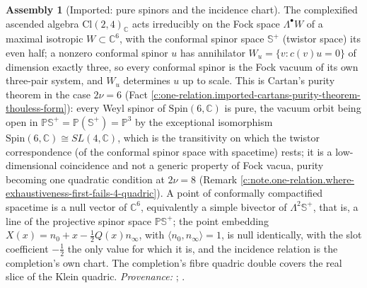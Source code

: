 \documentclass[11pt]{article}
\theoremstyle{definition}
\newtheorem{assembled}[theorem]{Assembly}
\theoremstyle{plain}
\newcommand{\changedmark}[2]{\marginpar{\raggedright\scriptsize\color{#1}#2}}
\providecommand{\C}{}\renewcommand{\C}{\mathbb{C}}
\providecommand{\CS}{}\renewcommand{\CS}{{\mathbb{S}^{+}}}
\providecommand{\Cl}{}\renewcommand{\Cl}{\mathrm{Cl}}
\providecommand{\PCS}{}\renewcommand{\PCS}{\mathbb{P}{\mathbb{S}^{+}}}
\providecommand{\ip}{}\renewcommand{\ip}[2]{\langle #1, #2\rangle}
\begin{document}
\begin{assembled}[Imported: pure spinors and the incidence chart]\label{c:one-relation.imported-pure-spinors-incidence-chart}
\changedmark{gray}{reworded}
The complexified ascended algebra $\Cl(2,4)_{\C}$ acts irreducibly on the Fock space $\Lambda^{\bullet}W$ of a maximal isotropic $W \subset \C^{6}$, with the conformal spinor space $\CS$ (twistor space) its even half; a nonzero conformal spinor $u$ has annihilator $W_{u} = \{v : c(v)u = 0\}$ of dimension exactly three, so every conformal spinor is the Fock vacuum of its own three-pair system, and $W_{u}$ determines $u$ up to scale. This is Cartan's purity theorem in the case $2\nu = 6$ (Fact \ref{c:one-relation.imported-cartans-purity-theorem-thouless-form}): every Weyl spinor of $\mathrm{Spin}(6, \C)$ is pure, the vacuum orbit being open in $\PCS = \mathbb{P}(\CS) = \mathbb{P}^{3}$ by the exceptional isomorphism $\mathrm{Spin}(6, \C) \cong SL(4, \C)$, which is the transitivity on which the twistor correspondence (of the conformal spinor space with spacetime) rests; it is a low-dimensional coincidence and not a generic property of Fock vacua, purity becoming one quadratic condition at $2\nu = 8$ (Remark \ref{c:note.one-relation.where-exhaustiveness-first-fails-4-quadric}). A point of conformally compactified spacetime is a null vector of $\C^{6}$, equivalently a simple bivector of $\Lambda^{2}\CS$, that is, a line of the projective spinor space $\PCS$; the point embedding $X(x) = n_{0} + x - \tfrac12 Q(x)n_{\infty}$, with $\ip{n_{0}}{n_{\infty}} = 1$, is null identically, with the slot coefficient $-\tfrac12$ the only value for which it is, and the incidence relation is the completion's own chart. The completion's fibre quadric double covers the real slice of the Klein quadric. \emph{Provenance:} \cite[Thm.~3.1, Thm.~3.4, Thm.~4.2, Thm.~5.3]{ButlerT9}; \cite[Fact~2.3, Rem.~5.2]{ButlerT11}.
\end{assembled}
\end{document}
